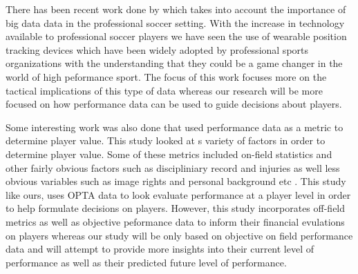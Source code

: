 \documentclass[12pt]{article}
\begin{document}
There has been recent work done by \citet{goes2021unlocking} which takes into 
account the importance of big data data in the professional soccer setting. 
With the increase in technology available to professional soccer players we have
seen the use of wearable position tracking devices which have been widely 
adopted by professional sports organizations with the understanding that they
could be a game changer in the world of high peformance sport. The focus of this 
work focuses more on the tactical implications of this type of data whereas
our research will be more focused on how performance data can be used to guide
decisions about players.

Some interesting work was also done that used performance data as a metric to 
determine player value. This study looked at s variety of factors in order to 
determine player value. Some of these metrics included on-field statistics and
other fairly obvious factors such as discipliniary record and injuries as well
less obvious variables such as image rights and personal background etc 
\citep{tunaru2010valuations}. This study like ours, uses OPTA data to look
evaluate performance at a player level in order to help formulate decisions on
players. However, this study incorporates off-field metrics as well as  objective
peformance data to inform their financial evulations on players whereas our
study will be only based on objective on field performance data and will attempt
to provide more insights into their current level of performance as well as
their predicted future level of performance.
\end{document}
